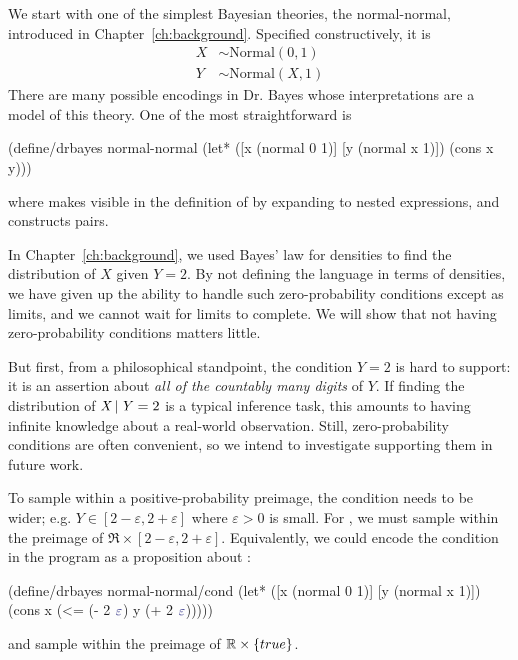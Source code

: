 We start with one of the simplest Bayesian theories, the normal-normal, introduced in Chapter~\ref{ch:background}.
Specified constructively, it is
\begin{equation}
\begin{aligned}
	X &\sim \mathrm{Normal}(0,1) \\
	Y &\sim \mathrm{Normal}(X,1)
\end{aligned}
\end{equation}
There are many possible encodings in Dr. Bayes whose interpretations are a model of this theory.
One of the most straightforward is
\begin{center}\singlespacing
\begin{schemedisplay}
(define/drbayes normal-normal
  (let* ([x  (normal 0 1)]
         [y  (normal x 1)])
    (cons x y)))
\end{schemedisplay}
\end{center}
where  makes  visible in the definition of  by expanding to nested  expressions, and  constructs pairs.

In Chapter~\ref{ch:background}, we used Bayes' law for densities to find the distribution of $\mathit{X}$ given $\mathit{Y} = 2$.
By not defining the language in terms of densities, we have given up the ability to handle such zero-probability conditions except as limits, and we cannot wait for limits to complete.
We will show that not having zero-probability conditions matters little.

But first, from a philosophical standpoint, the condition $\mathit{Y} = 2$ is hard to support: it is an assertion about \emph{all of the countably many digits} of $\mathit{Y}$.
If finding the distribution of $\mathit{X} \,|\, \mathit{Y} = 2$ is a typical inference task, this amounts to having infinite knowledge about a real-world observation.
Still, zero-probability conditions are often convenient, so we intend to investigate supporting them in future work.

To sample within a positive-probability preimage, the condition needs to be wider; e.g. $\mathit{Y} \in [2-\varepsilon,2+\varepsilon]$ where $\varepsilon > 0$ is small.
For , we must sample within the preimage of $\Re \times [2-\varepsilon,2+\varepsilon]$.
Equivalently, we could encode the condition in the program as a proposition about :
\begin{center}\singlespacing
\begin{schemedisplay}
(define/drbayes normal-normal/cond
  (let* ([x  (normal 0 1)]
         [y  (normal x 1)])
    (cons x (<= (- 2 $\va{\varepsilon}$) y (+ 2 $\va{\varepsilon}$)))))
\end{schemedisplay}
\end{center}
and sample within the preimage of $\mathbb{R} \times \{{true}\}$.

